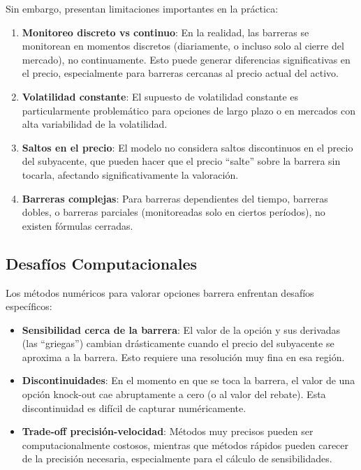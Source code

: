 Sin embargo, presentan limitaciones importantes en la práctica:

\begin{enumerate}
    \item \textbf{Monitoreo discreto vs continuo}: En la realidad, las barreras se monitorean en momentos discretos (diariamente, o incluso solo al cierre del mercado), no continuamente. Esto puede generar diferencias significativas en el precio, especialmente para barreras cercanas al precio actual del activo.
    
    \item \textbf{Volatilidad constante}: El supuesto de volatilidad constante es particularmente problemático para opciones de largo plazo o en mercados con alta variabilidad de la volatilidad.
    
    \item \textbf{Saltos en el precio}: El modelo no considera saltos discontinuos en el precio del subyacente, que pueden hacer que el precio ``salte'' sobre la barrera sin tocarla, afectando significativamente la valoración.
    
    \item \textbf{Barreras complejas}: Para barreras dependientes del tiempo, barreras dobles, o barreras parciales (monitoreadas solo en ciertos períodos), no existen fórmulas cerradas.
\end{enumerate}

\subsection{Desafíos Computacionales}

Los métodos numéricos para valorar opciones barrera enfrentan desafíos específicos:

\begin{itemize}
    \item \textbf{Sensibilidad cerca de la barrera}: El valor de la opción y sus derivadas (las ``griegas'') cambian drásticamente cuando el precio del subyacente se aproxima a la barrera. Esto requiere una resolución muy fina en esa región.
    
    \item \textbf{Discontinuidades}: En el momento en que se toca la barrera, el valor de una opción knock-out cae abruptamente a cero (o al valor del rebate). Esta discontinuidad es difícil de capturar numéricamente.
    
    \item \textbf{Trade-off precisión-velocidad}: Métodos muy precisos pueden ser computacionalmente costosos, mientras que métodos rápidos pueden carecer de la precisión necesaria, especialmente para el cálculo de sensibilidades.
\end{itemize}

